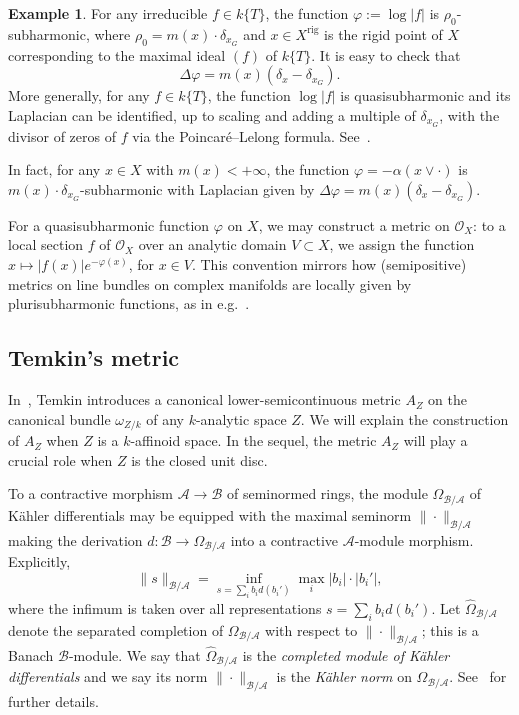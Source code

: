 \documentclass[10pt,reqno]{amsart}
\theoremstyle{plain}
\theoremstyle{definition}
\newtheorem{example}[theorem]{Example}
\numberwithin{equation}{section}
\renewcommand{\O}{\mathcal{O}}
\DeclareMathOperator{\rig}{rig}
\begin{document}
\begin{example}
For any irreducible $f \in k\{ T \}$, the function $\varphi := \log |f|$ is $\rho_0$-subharmonic, where $\rho_0 = m(x)\cdot \delta_{x_G}$ and $x \in X^{\rig}$ is the rigid point of $X$ corresponding to the maximal ideal $(f)$ of $k\{ T \}$.
 It is easy to check that 
$$
\Delta \varphi =  m(x) \left( \delta_{x} - \delta_{x_G} \right).
$$
More generally, for any $f \in k\{ T \}$, the function $\log |f|$ is quasisubharmonic and its Laplacian can be identified, up to scaling and adding a multiple of $\delta_{x_G}$, with the divisor of zeros of $f$ via the Poincar\'e--Lelong formula. See~\cite[Example 5.20]{baker-rumely}.

In fact, for any $x \in X$ with $m(x) < +\infty$, the function $\varphi = -\alpha(x \vee \cdot)$ is $m(x) \cdot \delta_{x_G}$-subharmonic with Laplacian given by $\Delta \varphi = m(x) \left( \delta_{x}-\delta_{x_G} \right)$.
\end{example}

For a quasisubharmonic function $\varphi$ on $X$, we may construct a metric on $\O_X$: to a local section $f$ of $\O_X$ over an analytic domain $V \subset X$, we assign the function $x \mapsto |f(x)|e^{-\varphi(x)}$, for $x \in V$. This convention mirrors how (semipositive) metrics on line bundles on complex manifolds are locally given by plurisubharmonic functions, as in e.g.~\cite[\S 3]{demailly12}.

\subsection{Temkin's metric}\label{section:temkin} In~\cite{temkin}, Temkin introduces a canonical lower-semicontinuous metric $A_Z$ on the canonical bundle $\omega_{Z/k}$ of any $k$-analytic space $Z$. We will explain the construction of $A_Z$ when $Z$ is a $k$-affinoid space. In the sequel, the metric $A_Z$ will play a crucial role when $Z$ is the closed unit disc.

To a contractive morphism $\mathcal{A} \to \mathcal{B}$ of seminormed rings, the module $\Omega_{\mathcal{B}/\mathcal{A}}$ of K\"ahler differentials may be equipped with the maximal seminorm $\| \cdot \|_{\mathcal{B}/\mathcal{A}}$ making the derivation $d \colon \mathcal{B} \to \Omega_{\mathcal{B}/\mathcal{A}}$ into a contractive $\mathcal{A}$-module morphism. Explicitly,
$$
\| s \|_{\mathcal{B}/\mathcal{A}} = \inf_{s = \sum_i b_i d(b_i')} \max_i |b_i| \cdot |b_i'|,
$$
where the infimum is taken over all representations $s = \sum_i b_i d(b_i')$. 
Let $\widehat{\Omega}_{\mathcal{B}/\mathcal{A}}$ denote the separated completion of $\Omega_{\mathcal{B}/\mathcal{A}}$ with respect to $\| \cdot \|_{\mathcal{B}/\mathcal{A}}$; this is a Banach $\mathcal{B}$-module. We say that $\widehat{\Omega}_{\mathcal{B}/\mathcal{A}}$ is the \emph{completed module of K\"ahler differentials} and we say its norm $\| \cdot \|_{\mathcal{B}/\mathcal{A}}$ is the \emph{K\"ahler norm} on $\widehat{\Omega}_{\mathcal{B}/\mathcal{A}}$. See~\cite[4.1]{temkin} for further details.
\end{document}
